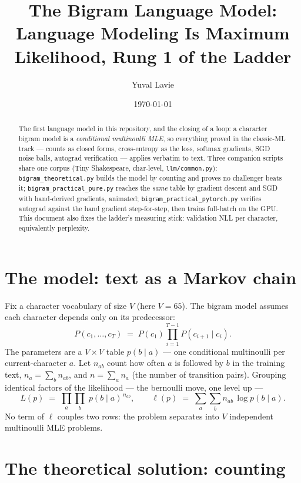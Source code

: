 \documentclass[11pt]{article}
\title{The Bigram Language Model:\\
Language Modeling Is Maximum Likelihood, Rung 1 of the Ladder}
\author{Yuval Lavie}
\date{\today}
\begin{document}
\maketitle

\begin{abstract}
The first language model in this repository, and the closing of a loop:
a character bigram model is a \emph{conditional multinoulli MLE}, so
everything proved in the classic-ML track --- counts as closed forms,
cross-entropy as the loss, softmax gradients, SGD noise balls, autograd
verification --- applies verbatim to text. Three companion scripts share
one corpus (Tiny Shakespeare, char-level, \texttt{llm/common.py}):
\texttt{bigram\_theoretical.py} builds the model by counting and proves
no challenger beats it; \texttt{bigram\_practical\_pure.py} reaches the
\emph{same} table by gradient descent and SGD with hand-derived
gradients, animated; \texttt{bigram\_practical\_pytorch.py} verifies
autograd against the hand gradient step-for-step, then trains
full-batch on the GPU. This document also fixes the ladder's measuring
stick: validation NLL per character, equivalently perplexity.
\end{abstract}

\section{The model: text as a Markov chain}

Fix a character vocabulary of size $V$ (here $V = 65$). The bigram
model assumes each character depends only on its predecessor:
\begin{equation}
  P(c_1, \dots, c_T)
  \;=\; P(c_1) \prod_{i=1}^{T-1} P(c_{i+1} \mid c_i).
  \label{eq:markov}
\end{equation}
The parameters are a $V \times V$ table $p(b \mid a)$ --- one
conditional multinoulli per current-character $a$. Let
$n_{ab}$ count how often $a$ is followed by $b$ in the training text,
$n_a = \sum_b n_{ab}$, and $n = \sum_a n_a$ (the number of transition
pairs). Grouping identical factors of the likelihood --- the bernoulli
move, one level up ---
\begin{equation}
  L(p) \;=\; \prod_{a}\prod_{b}\; p(b \mid a)^{\,n_{ab}},
  \qquad
  \ell(p) \;=\; \sum_{a}\sum_{b} n_{ab}\,\log p(b \mid a).
  \label{eq:loglik}
\end{equation}
No term of $\ell$ couples two rows: the problem separates into $V$
independent multinoulli MLE problems.

\section{The theoretical solution: counting}
\end{document}
